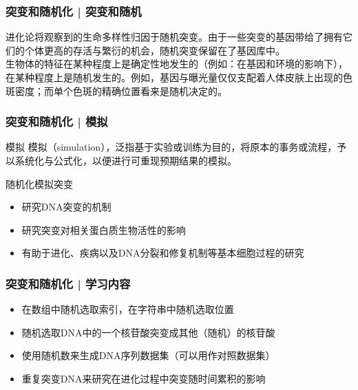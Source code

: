 \begin{frame}
  \frametitle{突变和随机化 | 突变和随机}
  进化论将观察到的生命多样性归因于随机突变。由于一些突变的基因带给了拥有它们的个体更高的存活与繁衍的机会，随机突变保留在了基因库中。\\
  \vspace{1em}
  生物体的特征在某种程度上是确定性地发生的（例如：在基因和环境的影响下），在某种程度上是随机发生的。例如，基因与曝光量仅仅支配着人体皮肤上出现的色斑密度；而单个色斑的精确位置看来是随机决定的。
\end{frame}

\begin{frame}
  \frametitle{突变和随机化 | 模拟}
  \begin{block}{模拟}
    模拟（simulation），泛指基于实验或训练为目的，将原本的事务或流程，予以系统化与公式化，以便进行可重现预期结果的模拟。
  \end{block}
  \pause
  \begin{block}{随机化模拟突变}
    \begin{itemize}
      \item 研究DNA突变的机制
      \item 研究突变对相关蛋白质生物活性的影响
      \item 有助于进化、疾病以及DNA分裂和修复机制等基本细胞过程的研究
    \end{itemize}
  \end{block}
\end{frame}

\begin{frame}
  \frametitle{突变和随机化 | 学习内容}
  \begin{itemize}
    \item 在数组中随机选取索引，在字符串中随机选取位置
    \item 随机选取DNA中的一个核苷酸突变成其他（随机）的核苷酸
    \item 使用随机数来生成DNA序列数据集（可以用作对照数据集）
    \item 重复突变DNA来研究在进化过程中突变随时间累积的影响
  \end{itemize}
\end{frame}


